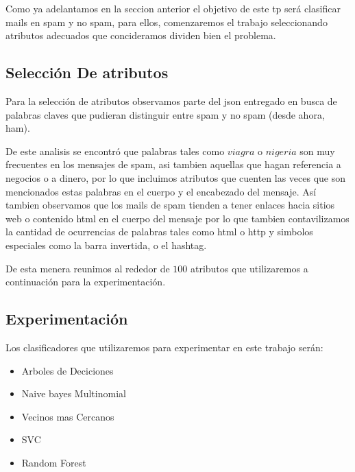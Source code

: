 Como ya adelantamos en la seccion anterior el objetivo de este tp será clasificar mails en spam y no spam, para ellos, comenzaremos el trabajo seleccionando atributos adecuados que concideramos dividen bien el problema.

\subsection{Selección De atributos}

Para la selección de atributos observamos parte del json entregado en busca de palabras claves que pudieran distinguir entre spam y no spam (desde ahora, ham).

De este analisis se encontró que palabras tales como $viagra$ o $nigeria$ son muy frecuentes en los mensajes de spam, asi tambien aquellas que hagan referencia a negocios o a dinero, por lo que incluimos atributos que cuenten las veces que son mencionados estas palabras en el cuerpo y el encabezado del mensaje. Así tambien observamos que los mails de spam tienden a tener enlaces hacia sitios web o contenido html en el cuerpo del mensaje por lo que tambien contavilizamos la cantidad de ocurrencias de palabras tales como html o http y simbolos especiales como la barra invertida, o el hashtag.

De esta menera reunimos al rededor de $100$ atributos que utilizaremos a continuación para la experimentación.

\subsection{Experimentación}

Los clasificadores que utilizaremos para experimentar en este trabajo serán: 
\begin{itemize}
\item	Arboles de Deciciones
\item	Naive bayes Multinomial
\item	Vecinos mas Cercanos
\item	SVC
\item	Random Forest
\end{itemize}